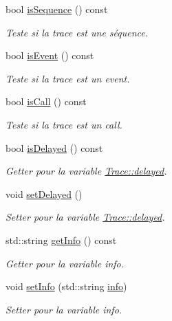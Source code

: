\begin{DoxyCompactItemize}
bool \hyperlink{class_trace_aaa85a39ff507206addd6cfd5a49bbca8}{is\+Sequence} () const 
\begin{DoxyCompactList}\small\item\em Teste si la trace est une séquence. \end{DoxyCompactList}\item 
bool \hyperlink{class_trace_a901bf10475a27420aa2ccd52388bc1fd}{is\+Event} () const 
\begin{DoxyCompactList}\small\item\em Teste si la trace est un event. \end{DoxyCompactList}\item 
bool \hyperlink{class_trace_a65fbddb70261866299cbaabb7c5f019e}{is\+Call} () const 
\begin{DoxyCompactList}\small\item\em Teste si la trace est un call. \end{DoxyCompactList}\item 
bool \hyperlink{class_trace_aabbb4de8e5b5ea0983021688800bd43f}{is\+Delayed} () const 
\begin{DoxyCompactList}\small\item\em Getter pour la variable \hyperlink{class_trace_a9757057cc65f9e45bbeaa848cb06d5a1}{Trace\+::delayed}. \end{DoxyCompactList}\item 
void \hyperlink{class_trace_ae534382e67e6abdf8614a30ebf849d03}{set\+Delayed} ()
\begin{DoxyCompactList}\small\item\em Setter pour la variable \hyperlink{class_trace_a9757057cc65f9e45bbeaa848cb06d5a1}{Trace\+::delayed}. \end{DoxyCompactList}\item 
std\+::string \hyperlink{class_trace_a077c3a0c551e5e898ec0f7cf3911e882}{get\+Info} () const 
\begin{DoxyCompactList}\small\item\em Getter pour la variable {\ttfamily info}. \end{DoxyCompactList}\item 
void \hyperlink{class_trace_a881e1e9879f9db561402f1381fc6fe3e}{set\+Info} (std\+::string \hyperlink{class_trace_a4835dcfa7da5d4c971e8f7d6860acb09}{info})
\begin{DoxyCompactList}\small\item\em Setter pour la variable {\ttfamily info}. \end{DoxyCompactList}\item 

\end{DoxyCompactItemize}
